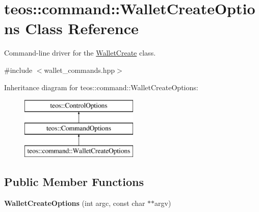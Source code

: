 \hypertarget{classteos_1_1command_1_1_wallet_create_options}{}\section{teos\+:\+:command\+:\+:Wallet\+Create\+Options Class Reference}
\label{classteos_1_1command_1_1_wallet_create_options}


Command-\/line driver for the \mbox{\hyperlink{classteos_1_1command_1_1_wallet_create}{Wallet\+Create}} class.  




{\ttfamily \#include $<$wallet\+\_\+commands.\+hpp$>$}

Inheritance diagram for teos\+:\+:command\+:\+:Wallet\+Create\+Options\+:\begin{figure}[H]
\begin{center}
\leavevmode
\includegraphics[height=3.000000cm]{classteos_1_1command_1_1_wallet_create_options}
\end{center}
\end{figure}
\subsection*{Public Member Functions}
\begin{DoxyCompactItemize}
\item 
\mbox{\label{classteos_1_1command_1_1_wallet_create_options_adfecccb1465e96428f2bac21dc4202f6}} 
{\bfseries Wallet\+Create\+Options} (int argc, const char $\ast$$\ast$argv)
\end{DoxyCompactItemize}
